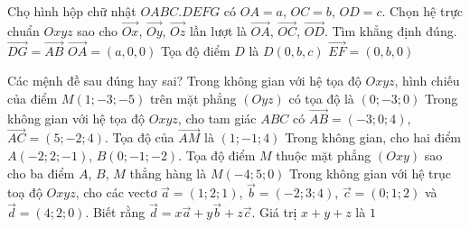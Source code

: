 \begin{ex}
Chọ hình hộp chữ nhật $OABC.DEFG$ có $OA=a$, $OC=b$, $OD=c$. Chọn hệ trực chuẩn $Oxyz$ sao cho $\overrightarrow{Ox}$, $\overrightarrow{Oy}$, $\overrightarrow{Oz}$ lần lượt là $\overrightarrow{OA}$, $\overrightarrow{OC}$, $\overrightarrow{OD}$. Tìm khẳng định đúng.	
	\choiceTF
	{$\overrightarrow{DG}=\overrightarrow{AB}$}
	{\True $\overrightarrow{OA}=(a,0,0)$}
	{Tọa độ điểm $D$ là $D(0,b,c)$}
	{\True $\overrightarrow{EF}=(0,b,0)$}
	\loigiai{
		
	}
\end{ex}
\begin{ex}
	Các mệnh đề sau đúng hay sai?
	\choiceTF
	{Trong không gian với hệ tọa độ $Oxyz$, hình chiếu của điểm $M( 1;-3;-5)$ trên mặt phẳng $(Oyz)$ có tọa độ là $(0;-3;0)$}
	{\True Trong không gian với hệ tọa độ $Oxyz$, cho tam giác $ABC$ có $\overrightarrow{AB}=(-3;0;4)$, $\overrightarrow{AC}=(5;-2;4)$. Tọa độ của $\overrightarrow{AM}$ là $(1;-1;4)$}
	{\True Trong không gian, cho hai điểm $A(-2;2;-1)$, $B(0;-1;-2)$. Tọa độ điểm $M$ thuộc mặt phẳng $(Oxy)$ sao cho ba điểm $A$, $B$, $M$  thẳng hàng là $M(-4;5;0)$}
	{Trong không gian với hệ trục toạ độ $Oxyz$, cho các vectơ $\overrightarrow{a}=( 1;2;1)$, $\overrightarrow{b}=(-2;3;4)$, $\overrightarrow{c}=(0;1;2)$ và $\overrightarrow{d}=(4;2;0)$. Biết rằng $\overrightarrow{d}=x\overrightarrow{a}+y\overrightarrow{b}+z\overrightarrow{c}$. Giá trị $x+y+z$ là $1$}
\end{ex}
